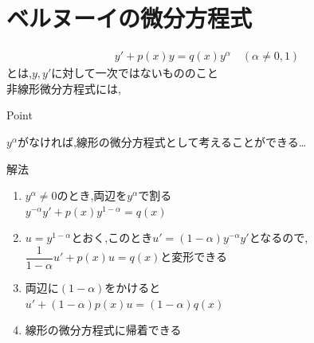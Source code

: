 \documentclass[a4paper]{jsarticle}
\begin{document}
\section{ベルヌーイの微分方程式}
\begin{eqnarray*}
    y'+p\left(x\right)y=q\left(x\right)y^{\alpha}\quad\left(\alpha\neq 0,1\right)
\end{eqnarray*}
とは,$y,y'$に対して一次ではないもののこと\\
非線形微分方程式には,
\begin{itembox}[l]{Point}
    \begin{center}
        $y^{\alpha}$がなければ,線形の微分方程式として考えることができる\dots
    \end{center}
\end{itembox}
\begin{itembox}[l]{解法}
    \begin{enumerate}[(1)]
        \item $y^{\alpha}\neq 0$のとき,両辺を$y^{\alpha}$で割る\\
              $y^{-\alpha} y'+p\left(x\right)y^{1-\alpha}=q\left(x\right)$
        \item $u=y^{1-\alpha}$とおく,このとき$u'=\left(1-\alpha\right)y^{-\alpha}y'$となるので,\\
              $\dfrac{1}{1-\alpha}u'+p\left(x\right)u=q\left(x\right)$と変形できる
        \item 両辺に$\left(1-\alpha\right)$をかけると\\
              $u'+\left(1-\alpha\right)p\left(x\right)u=\left(1-\alpha\right)q\left(x\right)$
        \item 線形の微分方程式に帰着できる
    \end{enumerate}
\end{itembox}
\end{document}
